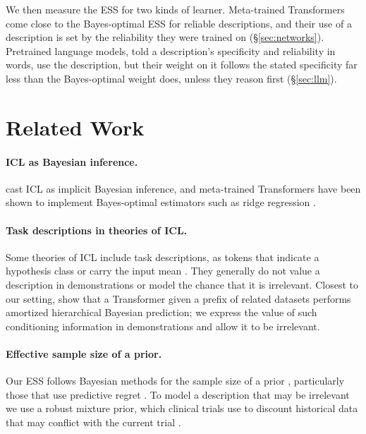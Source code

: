 \documentclass{article}
\begin{document}
We then measure the ESS for two kinds of learner. Meta-trained Transformers come close to the Bayes-optimal ESS for reliable descriptions, and their use of a description is set by the reliability they were trained on (\S\ref{sec:networks}). Pretrained language models, told a description's specificity and reliability in words, use the description, but their weight on it follows the stated specificity far less than the Bayes-optimal weight does, unless they reason first (\S\ref{sec:llm}).

\section{Related Work}
\paragraph{ICL as Bayesian inference.} \citet{xie2022} cast ICL as implicit Bayesian inference, and meta-trained Transformers have been shown to implement Bayes-optimal estimators such as ridge regression \citep{akyurek2023, raventos2023, panwar2024}.

\paragraph{Task descriptions in theories of ICL.} Some theories of ICL include task descriptions, as tokens that indicate a hypothesis class or carry the input mean \citep{huangge2025, lin2025, tong2026, lin2024}. They generally do not value a description in demonstrations or model the chance that it is irrelevant. Closest to our setting, \citet{zhu2026} show that a Transformer given a prefix of related datasets performs amortized hierarchical Bayesian prediction; we express the value of such conditioning information in demonstrations and allow it to be irrelevant.

\paragraph{Effective sample size of a prior.} Our ESS follows Bayesian methods for the sample size of a prior \citep{morita2008, reimherr2021, neuenschwander2020}, particularly those that use predictive regret \citep{reznik2026}. To model a description that may be irrelevant we use a robust mixture prior, which clinical trials use to discount historical data that may conflict with the current trial \citep{schmidli2014}.
\end{document}
